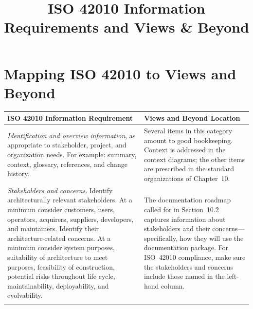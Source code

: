 \documentclass[11pt]{article}
\begin{document}
\title{ISO 42010 Information Requirements and Views \& Beyond}
\author{}
\date{}
\maketitle

\section*{Mapping ISO 42010 to Views and Beyond}

\begin{tabularx}{\textwidth}{@{}%
  >{\raggedright\arraybackslash}p{}%
  >{\raggedright\arraybackslash}p{}@{}}
\toprule
\textbf{ISO 42010 Information Requirement} &
\textbf{Views and Beyond Location} \\
\midrule

\textit{Identification and overview information}, as appropriate to
stakeholder, project, and organization needs. For example: summary, context,
glossary, references, and change history. &
Several items in this category amount to good bookkeeping. Context is
addressed in the context diagrams; the other items are prescribed in the
standard organizations of Chapter~10. \\
\addlinespace[0.6em]

\textit{Stakeholders and concerns}. Identify architecturally relevant
stakeholders. At a minimum consider customers, users, operators, acquirers,
suppliers, developers, and maintainers. Identify their architecture-related
concerns. At a minimum consider system purposes, suitability of architecture to
meet purposes, feasibility of construction, potential risks throughout life
cycle, maintainability, deployability, and evolvability. &
The documentation roadmap called for in Section~10.2 captures information
about stakeholders and their concerns---specifically, how they will use the
documentation package. For ISO~42010 compliance, make sure the stakeholders
and concerns include those named in the left-hand column. \\
\addlinespace[0.6em]


\end{tabularx}
\end{document}
